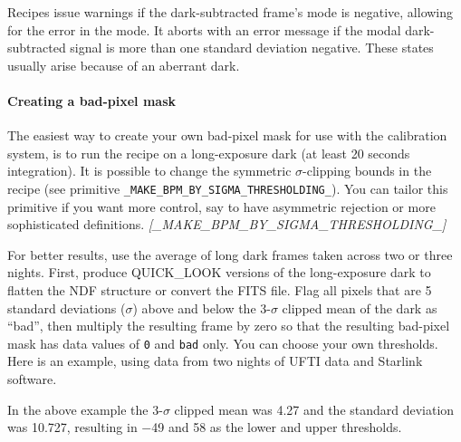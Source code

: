 \documentclass[twoside,11pt,nolof]{starlink}
\begin{document}
Recipes issue warnings if the dark-subtracted frame's mode is
negative, allowing for the error in the mode.  It aborts with an error
message if the modal dark-subtracted signal is more than one standard
deviation negative.  These states usually arise because of an aberrant
dark.

\paragraph{Creating a bad-pixel
mask\label{create_bad-pixel_mask}}

The easiest way to create your own bad-pixel mask for use with the
calibration system, is to run the 
recipe on a long-exposure dark (at least 20 seconds integration).  It
is possible to change the symmetric $\sigma$-clipping bounds in the
recipe (see primitive {\tt\_MAKE\_BPM\_BY\_SIGMA\_THRESHOLDING\_}).
You can tailor this primitive if you want more control, say to have
asymmetric rejection or more sophisticated definitions.
\newline \emph{[\_MAKE\_BPM\_BY\_SIGMA\_THRESHOLDING\_]}

For better results, use the average of long dark frames taken across
two or three nights.  First, produce QUICK\_LOOK versions of the
long-exposure dark to flatten the NDF structure or convert the FITS
file.  Flag all pixels that are 5 standard deviations ($\sigma$) above
and below the 3-$\sigma$ clipped mean of the dark as ``bad'', then
multiply the resulting frame by zero so that the resulting bad-pixel
mask has data values of \texttt{0} and \texttt{bad} only.  You can choose your
own thresholds.  Here is an example, using data from two nights of
UFTI data and Starlink software.

\begin{terminalv}

\end{terminalv}

In the above example the 3-$\sigma$ clipped mean was 4.27 and the standard deviation
was 10.727, resulting in $-$49 and 58 as the lower and upper thresholds.
\end{document}
